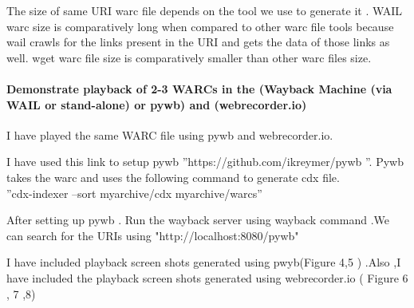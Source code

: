\documentclass[12pt]{Report}
\begin{document}
The size of same URI warc file depends on the tool we use to generate it . WAIL warc size is comparatively long when compared to other warc file tools because wail crawls for the links present in the URI and gets the data of those links as well. wget warc file size is comparatively smaller than other warc files size. 



\paragraph{Demonstrate playback of 2-3 WARCs in the (Wayback Machine (via WAIL or stand-alone) or pywb) and (webrecorder.io)
} 


I have played the same WARC file using pywb and webrecorder.io. 

I have used this link to setup pywb ''https://github.com/ikreymer/pywb ''.
Pywb takes the warc and uses the following command to generate cdx file.\\

''cdx-indexer --sort myarchive/cdx myarchive/warcs''


After setting up pywb . Run the wayback server using wayback command .We can search for the URIs using "http://localhost:8080/pywb"




I have  included playback screen shots generated using pwyb(Figure 4,5 ) .Also ,I have included the playback screen shots generated using webrecorder.io ( Figure 6 , 7 ,8)
\end{document}
